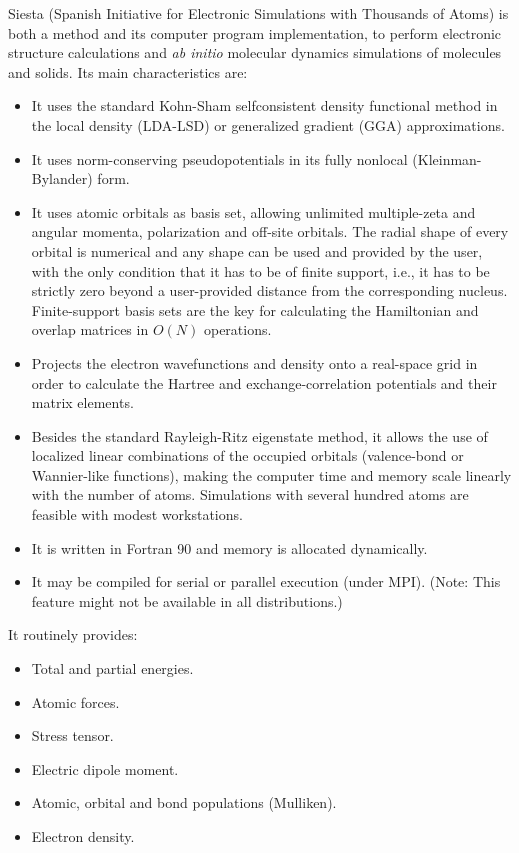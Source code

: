 \documentclass[11pt]{article}
\begin{document}
{\sc Siesta} (Spanish Initiative for 
Electronic Simulations with
Thousands of Atoms) is both a method and its computer program implementation,
to perform electronic structure calculations and {\it ab initio} molecular 
dynamics simulations of molecules and solids. Its main characteristics are:
\begin{itemize}
\item
It uses the standard Kohn-Sham selfconsistent density functional
method in the local density (LDA-LSD) or generalized gradient (GGA)
approximations.
\item
It uses norm-conserving pseudopotentials in its fully nonlocal
(Kleinman-Bylander) form.
\item
It uses atomic orbitals as basis set, allowing unlimited multiple-zeta
and angular momenta, polarization and off-site orbitals. The radial
shape of every orbital is numerical and any shape can be used and provided 
by the user, with the only condition that it has to be of finite support,
i.e., it has to be strictly zero beyond a user-provided distance from the 
corresponding nucleus.
Finite-support basis sets are the key for calculating the Hamiltonian 
and overlap matrices in $O(N)$ operations.
\item
Projects the electron wavefunctions and density onto a real-space
grid in order to calculate the Hartree and exchange-correlation
potentials and their matrix elements.
\item
Besides the standard Rayleigh-Ritz eigenstate method, it allows
the use of localized linear combinations of the occupied orbitals
(valence-bond or Wannier-like functions), making the computer
time and memory scale linearly with the number of atoms.
Simulations with several hundred atoms are feasible with
modest workstations.
\item
It is written in Fortran 90 and memory is allocated dynamically.  
\item
It may be compiled for serial or parallel execution (under MPI).
(Note: This feature might not be available in all distributions.)

\end{itemize}

It routinely provides:
\begin{itemize}
\item Total and partial energies.
\item Atomic forces.
\item Stress tensor.
\item Electric dipole moment.
\item Atomic, orbital and bond populations (Mulliken).
\item Electron density.
\end{itemize}
\end{document}
